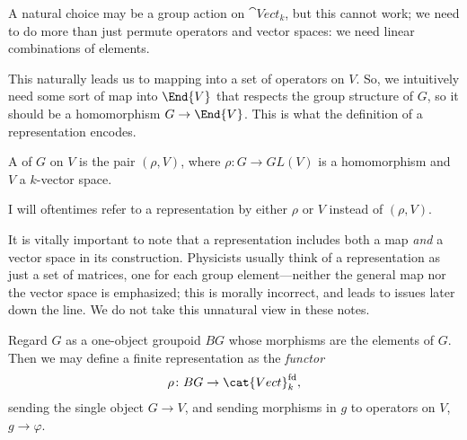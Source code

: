 \documentclass[11pt]{article}
\begin{document}
A natural choice may be a group action on $\cat{Vect}_k$, 
but this cannot work; we need to do more than just permute
operators and vector spaces: we need linear combinations of elements.

This naturally leads us to mapping into a set of operators on 
$V$. So, we intuitively need some sort of map into $\End{V}$ that 
respects the group structure of $G$, so it should be a homomorphism
$G \to \End{V}$. This is what the definition of a representation encodes.

\begin{definition}
    A  of $G$ on $V$ is the pair $(\rho, V)$,
    where $\rho \colon G \to GL(V)$ is a homomorphism and $V$
    a $k$-vector space.
\end{definition}

\begin{nnote}
    I will oftentimes refer to a representation by either $\rho$
    or $V$ instead of $(\rho, V)$.
\end{nnote}

\begin{reemark}
    It is vitally important to note that a representation
    includes both a map \emph{and} a vector space in its construction.
    Physicists usually think of a representation as just a set of matrices,
    one for each group element---neither the general map nor the vector space 
    is emphasized; this is morally incorrect, and leads to issues later down the 
    line. We do not take this unnatural view in these notes.
\end{reemark}

\begin{nnote}
    Regard $G$ as a one-object groupoid $BG$ whose morphisms
    are the elements of $G$. Then we may define a finite representation 
    as the \emph{functor}
    \begin{align*}
        \rho \colon BG \to \cat{Vect}_k^{\rm fd},
    \end{align*}
    sending the single object $G \to V$, and sending morphisms
    in $g$ to operators on $V$, $g \to \varphi$.
\end{nnote}
\end{document}
